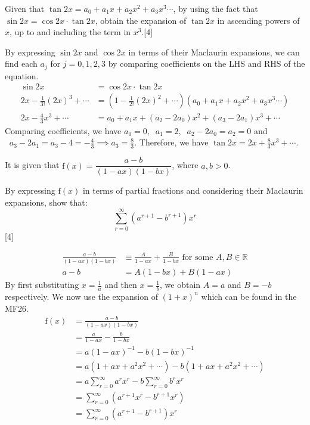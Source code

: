\documentclass[12pt, a4 paper]{article}
\begin{document}
\begin{outline}[enumerate]
 \1 Given that \(\tan{2x}=a_{0}+a_{1}x+a_{2}x^2+a_{3}x^3\cdots \), by using the fact that \(\sin{2x}=\cos{2x}\cdot \tan{2x}\), obtain the expansion of \(\tan{2x}\) in ascending powers of \(x\), up to and including the term in \(x^3\).\hfill[4] %
 \begin{answer}
  By expressing \(\sin{2x}\) and \(\cos{2x}\) in terms of their Maclaurin expansions, we can find each \(a_{j}\) for \(j=0,1,2,3\) by comparing coefficients on the LHS and RHS of the equation.
  \begin{align*}
   \sin{2x}                       & =\cos{2x}\cdot \tan{2x}                                                 \\
   2x-\frac{1}{3!}{(2x)}^3+\cdots & = (1-\frac{1}{2!}{(2x)}^2+\cdots)(a_{0}+a_{1}x+a_{2}x^2+a_{3}x^3\cdots) \\
   2x-\frac{4}{3}x^3+\cdots       & = a_{0}+a_{1}x+(a_{2}-2a_{0})x^2+(a_{3}-2a_{1})x^3+\cdots
  \end{align*}
  Comparing coefficients, we have \(a_{0}=0,\; \; a_{1}=2,\; \; a_{2}-2a_{0}=a_{2}=0\) \; and \( \; \;a_{3}-2a_{1}=a_{3}-4=-\frac{4}{3}\implies a_{3}=\frac{8}{3}\). Therefore, we have \(\tan{2x}=2x+\frac{8}{3}x^3+\cdots \).
 \end{answer}

 \1 It is given that \(\textrm{f}(x)=\dfrac{a-b}{(1-ax)(1-bx)}\), where \(a,b>0\). %

 \2 By expressing \(\textrm{f}(x)\) in terms of partial fractions and considering their Maclaurin expansions, show that:
 \begin{equation*}
  \sum_{r=0}^{\infty}(a^{r+1}-b^{r+1})x^{r}
 \end{equation*}\hfill[4]
 \begin{answer}
  \begin{align*}
   \frac{a-b}{(1-ax)(1-bx)} & \equiv \frac{A}{1-ax} + \frac{B}{1-bx} \textrm{ for some \(A,B\in \mathbb{R}\)} \\
   a-b                      & = A(1-bx) + B(1-ax)
  \end{align*}
  By first substituting \(x=\frac{1}{a}\) and then \(x=\frac{1}{b}\), we obtain \(A=a\) and \(B=-b\) respectively. We now use the expansion of \({(1+x)}^n\) which can be found in the MF26.
  \begin{align*}
   \textrm{f}(x) & =\frac{a-b}{(1-ax)(1-bx)}                                         \\
                 & = \frac{a}{1-ax} - \frac{b}{1-bx}                                 \\
                 & = a{(1-ax)}^{-1} - b{(1-bx)}^{-1}                                 \\
                 & = a(1+ax+a^2x^2+\cdots) - b(1+ax+a^2x^2+\cdots)                   \\
                 & = a\sum_{r=0}^{\infty}{a^r}{x^r} - b\sum_{r=0}^{\infty}{b^r}{x^r} \\
                 & = \sum_{r=0}^{\infty}(a^{r+1}x^r - b^{r+1}x^r)                    \\
                 & = \sum_{r=0}^{\infty}(a^{r+1}-b^{r+1})x^r
  \end{align*}
 \end{answer}


\end{outline}
\end{document}
